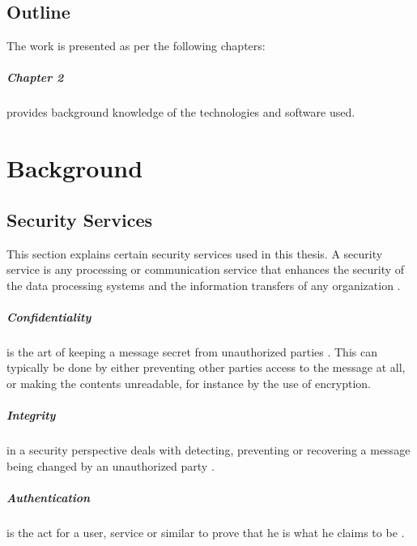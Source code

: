 \documentclass[pdftex,english,10pt,b5paper,twoside]{book}
\begin{document}
\section{Outline}

The work is presented as per the following chapters:

\paragraph{Chapter 2} provides background knowledge of the technologies and
software used.


\chapter{Background}

\section{Security Services}

This section explains certain security services used in this thesis. A security
service is any processing or communication service that enhances the security of
the data processing systems and the information transfers of any organization
\cite[p. 12]{stallings}.

\paragraph{Confidentiality} is the art of keeping a message secret from
unauthorized parties \cite[p. 18]{stallings}. This can typically be done by
either preventing other parties access to the message at all, or making the
contents unreadable, for instance by the use of encryption.

\paragraph{Integrity} in a security perspective deals with detecting,
preventing or recovering a message being changed by an unauthorized party
\cite{stallings}.

\paragraph{Authentication} is the act for a user, service or similar to prove
that he is what he claims to be \cite{stallings}.
\end{document}

